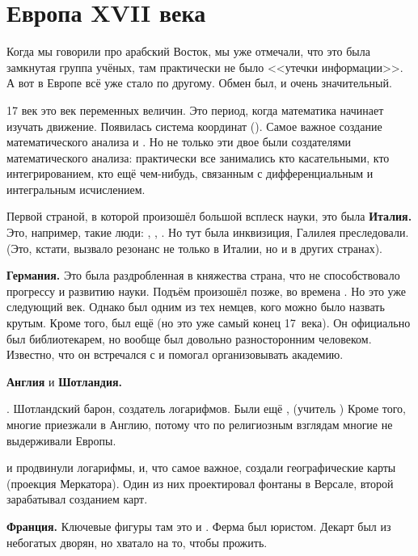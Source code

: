 \documentclass[a4paper,oneside,fleqn,10pt]{article}
\begin{document}

\section{Европа XVII века}

Когда мы говорили про арабский Восток, мы уже отмечали, что это была
замкнутая группа учёных, там практически не было <<утечки
информации>>.  А вот в Европе всё уже стало по другому. Обмен был, и
очень значительный.

17 век это век переменных величин.  Это период, когда математика
начинает изучать движение.  Появилась система координат
(). Самое важное создание математического анализа
 и .  Но не только
эти двое были создателями математического анализа: практически все
занимались кто касательными, кто интегрированием, кто ещё чем-нибудь,
связанным с дифференциальным и интегральным исчислением.

Первой страной, в которой произошёл большой всплеск науки, это была
\textbf{Италия.}  Это, например, такие люди: ,
, .  Но тут была инквизиция, Галилея
преследовали.  (Это, кстати, вызвало резонанс не только в Италии, но и
в других странах).

\textbf{Германия.} Это была раздробленная в княжества страна, что
 не способствовало прогрессу и развитию науки. Подъём произошёл
позже, во времена . Но это уже следующий
век. Однако  был одним из тех немцев, кого можно было
назвать крутым.  Кроме того, был ещё  (но это уже самый
конец 17~века).  Он официально был библиотекарем, но вообще был
довольно разносторонним человеком. Известно, что он встречался с
 и помогал организовывать академию.

\textbf{Англия} и \textbf{Шотландия.}

. Шотландский барон, создатель
логарифмов.  Были ещё ,  (учитель
) Кроме того, многие приезжали в Англию, потому
что по религиозным взглядам многие не выдерживали Европы.

 и 
продвинули логарифмы, и, что самое важное, создали географические
карты (проекция Меркатора).  Один из них проектировал фонтаны в
Версале, второй зарабатывал созданием карт.

\textbf{Франция.} Ключевые фигуры там это  и
.  Ферма был юристом. Декарт был из небогатых дворян, но
хватало на то, чтобы прожить.
\end{document}
